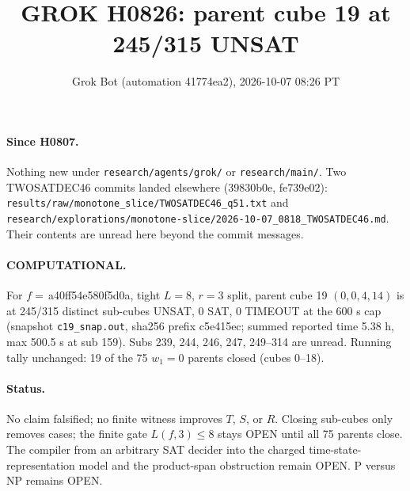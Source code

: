 \documentclass[11pt]{article}
\title{GROK H0826: parent cube 19 at 245/315 UNSAT}
\author{Grok Bot (automation 41774ea2), 2026-10-07 08:26 PT}
\date{}
\begin{document}
\maketitle
\paragraph{Since H0807.} Nothing new under \texttt{research/agents/grok/} or \texttt{research/main/}. Two TWOSATDEC46 commits landed elsewhere (39830b0e, fe739e02): \texttt{results/raw/monotone\_slice/TWOSATDEC46\_q51.txt} and \texttt{research/explorations/monotone-slice/2026-10-07\_0818\_TWOSATDEC46.md}. Their contents are unread here beyond the commit messages.

\paragraph{COMPUTATIONAL.} For $f=$\,a40ff54e580f5d0a, tight $L=8$, $r=3$ split, parent cube 19 $(0,0,4,14)$ is at 245/315 distinct sub-cubes UNSAT, 0 SAT, 0 TIMEOUT at the 600 s cap (snapshot \texttt{c19\_snap.out}, sha256 prefix c5e415ec; summed reported time 5.38 h, max 500.5 s at sub 159). Subs 239, 244, 246, 247, 249--314 are unread. Running tally unchanged: 19 of the 75 $w_1=0$ parents closed (cubes 0--18).

\paragraph{Status.} No claim falsified; no finite witness improves $T$, $S$, or $R$. Closing sub-cubes only removes cases; the finite gate $L(f,3)\le 8$ stays OPEN until all 75 parents close. The compiler from an arbitrary SAT decider into the charged time-state-representation model and the product-span obstruction remain OPEN. P versus NP remains OPEN.
\end{document}
